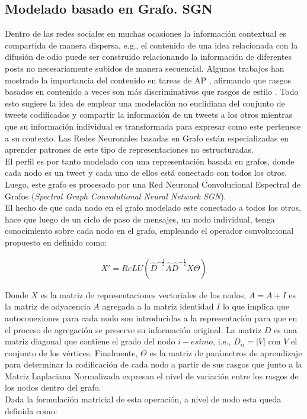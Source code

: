 	\subsection{Modelado basado en Grafo. SGN}\label{sgn}
	
	Dentro de las redes sociales en muchas ocasiones la información contextual es compartida de manera dispersa, e.g., el contenido de una idea relacionada con la difusión de odio puede ser construido relacionando la información de diferentes posts no necesariamente subidos de manera secuencial. Algunos trabajos han mostrado la importancia del contenido en tareas de AP \citep{OrtegaMendoza2018EmphasizingPI}, afirmando que rasgos basados en contenido a veces son más discriminativos que rasgos de estilo \citep{reddy2016survey}. Todo esto sugiere la idea de emplear una modelación no euclidiana del conjunto de tweets codificados y compartir la información de un tweets a los otros mientras que su información individual es transformada para expresar como este pertenece a su contexto.
	Las Redes Neuronales basadas en Grafo están especializadas en aprender patrones de este tipo de representaciones no estructuradas.
	\\
	El perfil es por tanto modelado con una representación basada en grafos, donde cada nodo es un tweet y cada uno de ellos está conectado con todos los otros. Luego, este grafo es procesado por una Red Neuronal Convolucional Espectral de Grafos (\textit{Spectral Graph Convolutional Neural Network SGN}).
	\\
	El hecho de que cada nodo en el grafo modelado este conectado a todos los otros, hace que luego de un ciclo de paso de mensajes, un nodo individual, tenga conocimiento sobre cada nodo en el grafo, empleando el operador convolucional propuesto en \citep{kipf2017semisupervised} definido como:
	
	\begin{align}\label{matrix-wise}
		X' = ReLU(\hat{D}^{-\frac{1}{2}}\hat{A}\hat{D}^{-\frac{1}{2}}X\Theta)
	\end{align}
	
	Donde $X$ es la matriz de representaciones vectoriales de los nodos, $\hat{A} = A + I$ es la matriz de adyacencia $A$ agregada a la matriz identidad $I$ lo que implica que autoconexiones para cada nodo son introducidas a la representación para que en el proceso de agregación se preserve su información original. La matriz $D$ es una matriz diagonal que contiene el grado del nodo $i-esimo$, i.e., $D_{ii} = |V|$ con $V$ el conjunto de los vértices. Finalmente, $\Theta$ es la matriz de parámetros de aprendizaje para determinar la codificación de cada nodo a partir de sus rasgos que junto a la Matriz Laplaciana Normalizada expresan el nivel de variación entre los rasgos de los nodos dentro del grafo.
	\\
	Dada la formulación matricial de esta operación, a nivel de nodo esta queda definida como: 
	
